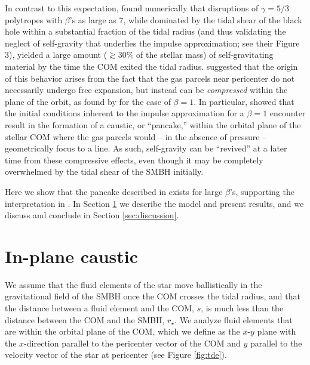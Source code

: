 \documentclass[twocolumn]{aastex62}
\begin{document}
In contrast to this expectation, \citet{steinberg19} found numerically that disruptions of $\gamma = 5/3$ polytropes with $\beta$'s as large as 7, while dominated by the tidal shear of the black hole within a substantial fraction of the tidal radius (and thus validating the neglect of self-gravity that underlies the impulse approximation; see their Figure 3), yielded a large amount ($\gtrsim 30\%$ of the stellar mass) of self-gravitating material by the time the COM exited the tidal radius. \citet{steinberg19} suggested that the origin of this behavior arises from the fact that the gas parcels near pericenter do not necessarily undergo free expansion, but instead can be \emph{compressed} within the plane of the orbit, as found by \citet{coughlin16} for the case of $\beta = 1$. In particular, \citet{coughlin16} showed that the initial conditions inherent to the impulse approximation for a $\beta = 1$ encounter result in the formation of a caustic, or ``pancake,'' within the orbital plane of the stellar COM where the gas parcels would -- in the absence of pressure -- geometrically focus to a line. As such, self-gravity can be ``revived'' at a later time from these compressive effects, even though it may be completely overwhelmed by the tidal shear of the SMBH initially.

Here we show that the pancake described in \citet{coughlin16} exists for large $\beta$'s, supporting the interpretation in \citet{steinberg19}. In Section \ref{sec:model} we describe the model and present results, and we discuss and conclude in Section \ref{sec:discussion}.

\section{In-plane caustic}
\label{sec:model}
We assume that the fluid elements of the star move ballistically in the gravitational field of the SMBH once the COM crosses the tidal radius, and that the distance between a fluid element and the COM, $s$, is much less than the distance between the COM and the SMBH, $r_{\star}$. We analyze fluid elements that are within the orbital plane of the COM, which we define as the $x$-$y$ plane with the $x$-direction parallel to the pericenter vector of the COM and $y$ parallel to the velocity vector of the star at pericenter (see Figure \ref{fig:tde}). 
\end{document}
